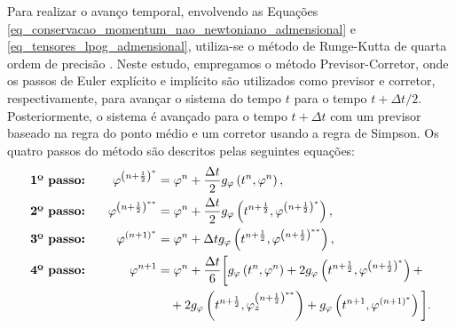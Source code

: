 Para realizar o avanço temporal, envolvendo as Equações \eqref{eq_conservacao_momentum_nao_newtoniano_admensional} e \eqref{eq_tensores_lpog_admensional}, utiliza-se o método de Runge-Kutta de quarta ordem de precisão \cite{ferziger2002computational}. Neste estudo, empregamos o método Previsor-Corretor, onde os passos de Euler explícito e implícito são utilizados como previsor e corretor, respectivamente, para avançar o sistema do tempo $t$ para o tempo $t + \Delta t / 2$. Posteriormente, o sistema é avançado para o tempo $t + \Delta t$ com um previsor baseado na regra do ponto médio e um corretor usando a regra de Simpson. Os quatro passos do método são descritos pelas seguintes equações:
\begin{gather}
    \begin{aligned}
        &\textbf{1º passo:}& \hspace{0.3cm}\varphi^{\left(n+\frac{1}{2}\right)^{*}} &= \varphi^n+\frac{\Delta t}{2} g_{\varphi}\left(t^n, \varphi^n\right),\\
        &\textbf{2º passo:}& \hspace{0.3cm}\varphi^{\left(n+\frac{1}{2}\right)^{* *}} &= \varphi^n+\frac{\Delta t}{2} g_{\varphi}\left(t^{n+\frac{1}{2}}, \varphi^{\left(n+\frac{1}{2}\right)^*}\right),\\
        &\textbf{3º passo:}& \hspace{0.3cm}\varphi^{(n+1)^*} &= \varphi^n+\Delta t g_{\varphi}\left(t^{n+\frac{1}{2}},\varphi^{\left(n+\frac{1}{2}\right)^{* *}}\right),\\
        &\textbf{4º passo:}& \hspace{0.3cm}\varphi^{n+1} &= \varphi^n+\frac{\Delta t}{6}\bigg[g_{\varphi}\left(t^n, \varphi^n\right) + 2 g_{\varphi}\left(t^{n+\frac{1}{2}}, \varphi^{\left(n+\frac{1}{2}\right)^{*}}\right) + \\
        & & & ~~~ + 2 g_{\varphi}\left(t^{n+\frac{1}{2}}, \varphi_{z}^{\left(n+\frac{1}{2}\right)^{**}}\right)+ g_{\varphi}\left(t^{n+1}, \varphi^{(n+1)^{*}}\right)\bigg].\label{eq_rk_4order}
    \end{aligned}
\end{gather}

